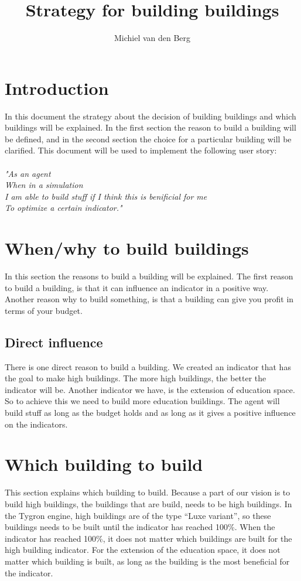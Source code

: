 \documentclass{article}
\author{Michiel van den Berg}
\title{Strategy for building buildings}
\begin{document}

\maketitle{}
\newpage{}

\section{Introduction}

In this document the strategy about the decision of building buildings and which buildings will be explained. In the first section the reason to build a building will be defined, and in the second section the choice for a particular building will be clarified. This document will be used to implement the following user story:\\
\\
\textit{"As an agent\\
When in a simulation\\
I am able to build stuff if I think 
this is benificial for me\\
To optimize a certain indicator."\\}

\section{When/why to build buildings}
In this section the reasons to build a building will be explained. The first reason to build a building, is that it can influence an indicator in a positive way. Another reason why to build something, is that a building can give you profit in terms of your budget.


\subsection{Direct influence}
There is one direct reason to build a building. We created an indicator that has the goal to make high buildings. The more high buildings, the better the indicator will be. Another indicator we have, is the extension of education space. So to achieve this we need to build more education buildings. The agent will build stuff as long as the budget holds and as long as it gives a positive influence on the indicators.


\section{Which building to build}
This section explains which building to build. Because a part of our vision is to build high buildings, the buildings that are build, needs to be high buildings. In the Tygron engine, high buildings are of the type “Luxe variant”, so these buildings needs to be built until the indicator has reached 100\%. When the indicator has reached 100\%, it does not matter which buildings are built for the high building indicator. For the extension of the education space, it does not matter which building is built, as long as the building is the most beneficial for the indicator. 
\end{document}

